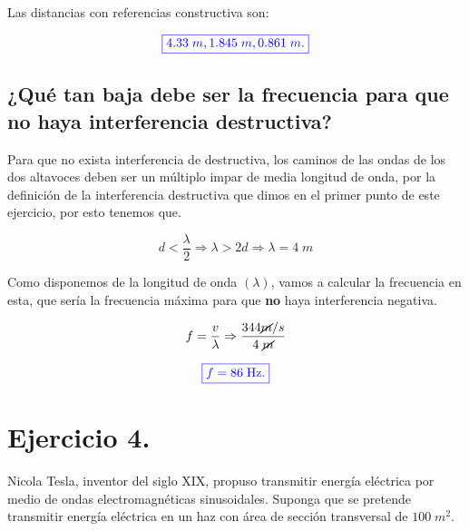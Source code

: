 \documentclass[a4paper,12pt]{article} %
\begin{document}
\vspace{\baselineskip}

\begin{justify}
    Las distancias con referencias constructiva son:
\end{justify}

\[\textcolor{blue}{\boxed{4.33 \; m, 1.845 \; m, 0.861 \; m.}}\]

\newpage

\subsection{¿Qué tan baja debe ser la frecuencia para que no haya interferencia destructiva?}

\vspace{\baselineskip}

\begin{justify}
    Para que no exista interferencia de destructiva, los caminos de las ondas de los dos altavoces
    deben ser un múltiplo impar de media longitud de onda, por la definición de la interferencia destructiva que 
    dimos en el primer punto de este ejercicio, por esto tenemos que. 
\end{justify}

\[ d < \frac{\lambda}{2} \Rightarrow \lambda > 2d \Rightarrow \lambda = 4 \;m\]


\begin{justify}
    Como disponemos de la longitud de onda \((\lambda)\), vamos a calcular la frecuencia en esta, que sería la frecuencia 
    máxima para que \textbf{no} haya interferencia negativa.
\end{justify}

\[f = \frac{v}{\lambda} \Rightarrow \frac{344 \cancel{m}/s}{4 \; \cancel{m}}\]

\vspace{\baselineskip}

\[\textcolor{blue}{\boxed{ f = 86 \; \text{Hz}.}}\]


\section{Ejercicio 4.}

\begin{justify}
    Nicola Tesla, inventor del siglo XIX, propuso transmitir energía eléctrica
    por medio de ondas electromagnéticas sinusoidales. Suponga que se pretende transmitir energía
    eléctrica en un haz con área de sección transversal de \(100 \; m^2\).
\end{justify}
\end{document}
